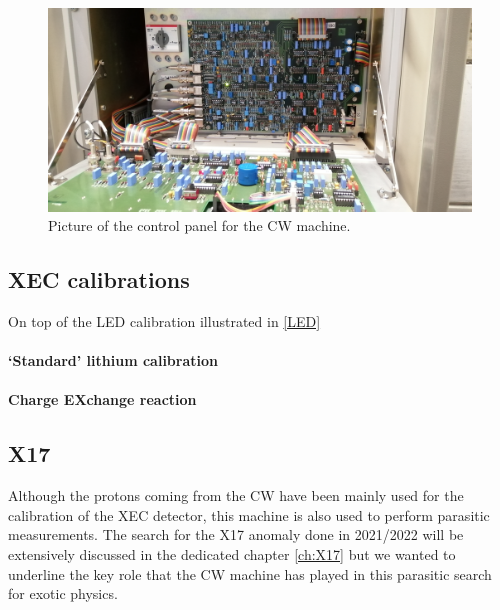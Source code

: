 \begin{refsection}
\begin{figure}
    \centering
    \includegraphics[width=1\textwidth]{Figures/MEG/CW/panel.jpg}
    \caption{Picture of the control panel for the CW machine.}
    \label{fig:CW:panel}
\end{figure}

\subsection{XEC calibrations}
On top of the LED calibration illustrated in \ref{LED} 
\paragraph{`Standard' lithium calibration}
\paragraph{Charge EXchange reaction}
\subsection{X17}
Although the protons coming from the CW have been mainly used for the calibration of the XEC detector, this machine is also used to perform parasitic measurements.
The search for the X17 anomaly done in 2021/2022 will be extensively discussed in the dedicated chapter \ref{ch:X17} but we wanted to underline the key role that the CW machine has played in this parasitic search for exotic physics. 


\end{refsection}
